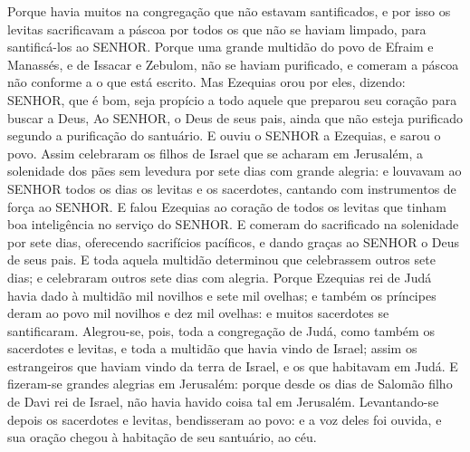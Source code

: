 {Porque havia muitos na congregação que não estavam santificados, e por isso os levitas sacrificavam a páscoa por todos os que não se haviam limpado, para santificá-los ao SENHOR.
Porque uma grande multidão do povo de Efraim e Manassés, e de Issacar e Zebulom, não se haviam purificado, e comeram a páscoa não conforme a o que está escrito. Mas Ezequias orou por eles, dizendo: SENHOR, que é bom, seja propício a todo aquele que preparou seu coração para buscar a Deus,
Ao SENHOR, o Deus de seus pais, ainda que não esteja purificado segundo a purificação do santuário.
E ouviu o SENHOR a Ezequias, e sarou o povo.
Assim celebraram os filhos de Israel que se acharam em Jerusalém, a solenidade dos pães sem levedura por sete dias com grande alegria: e louvavam ao SENHOR todos os dias os levitas e os sacerdotes, cantando com instrumentos de força ao SENHOR.
E falou Ezequias ao coração de todos os levitas que tinham boa inteligência no serviço do SENHOR. E comeram do sacrificado na solenidade por sete dias, oferecendo sacrifícios pacíficos, e dando graças ao SENHOR o Deus de seus pais.
E toda aquela multidão determinou que celebrassem outros sete dias; e celebraram outros sete dias com alegria.
Porque Ezequias rei de Judá havia dado à multidão mil novilhos e sete mil ovelhas; e também os príncipes deram ao povo mil novilhos e dez mil ovelhas: e muitos sacerdotes se santificaram.
Alegrou-se, pois, toda a congregação de Judá, como também os sacerdotes e levitas, e toda a multidão que havia vindo de Israel; assim os estrangeiros que haviam vindo da terra de Israel, e os que habitavam em Judá.
E fizeram-se grandes alegrias em Jerusalém: porque desde os dias de Salomão filho de Davi rei de Israel, não havia havido coisa tal em Jerusalém.
Levantando-se depois os sacerdotes e levitas, bendisseram ao povo: e a voz deles foi ouvida, e sua oração chegou à habitação de seu santuário, ao céu.

}
